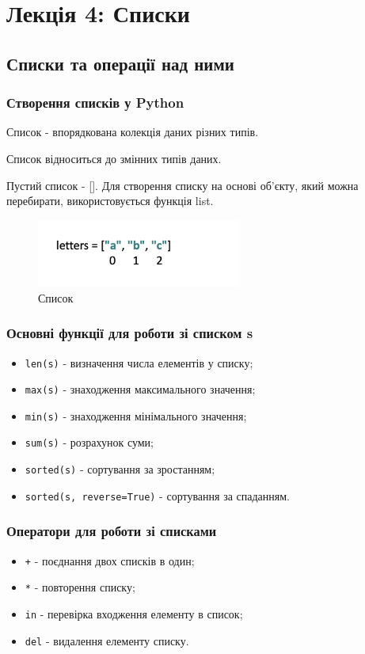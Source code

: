 \section*{Лекція 4: Списки}
\subsection{Списки та операції над ними} 
\begin{frame}
\frametitle{Створення списків у Python}
Список - впорядкована колекція даних різних типів.

Список відноситься до змінних типів даних.

Пустий список - []. Для створення списку на основі об'єкту, який можна перебирати, використовується функція list.
\begin{figure}
\begin{center}
 \includegraphics[width=0.6\textwidth]{pictures/list.png}
\caption{Список}
\label{list} 
\end{center}
\end{figure}

\end{frame}

 
\begin{frame}
\frametitle{Основні  функції для роботи зі списком s}
    \begin{itemize}
        \item<1-> \texttt{len(s)} - визначення числа елементів у списку;
        \item<2-> \texttt{max(s)} - знаходження максимального значення;
        \item<2-> \texttt{min(s)} - знаходження мінімального значення;
        \item<3-> \texttt{sum(s)} - розрахунок суми;
        \item<4-> \texttt{sorted(s)} - сортування за зростанням;
        \item<4-> \texttt{sorted(s, reverse=True)} - сортування за спаданням.
    \end{itemize}
\end{frame}

\begin{frame}
\frametitle{Оператори для роботи зі списками}
    \begin{itemize}
        \item<1-> \texttt{+} - поєднання двох списків в один;
        \item<2-> \texttt{*} - повторення списку;
        \item<3-> \texttt{in} - перевірка входження елементу в список;
        \item<4-> \texttt{del} - видалення елементу списку.
    \end{itemize}
\end{frame}

